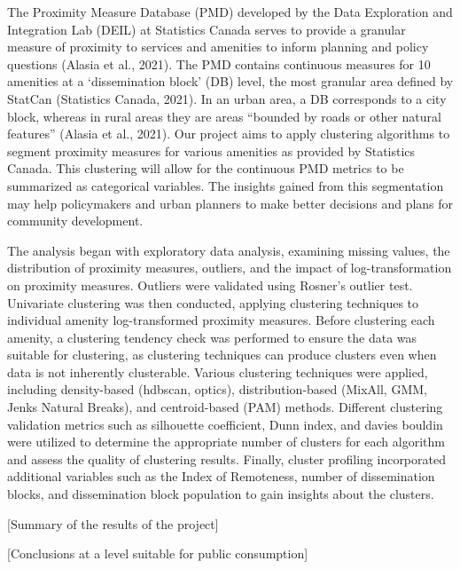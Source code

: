 \documentclass[11pt, a4paper]{article}
\begin{document}
\normalsize
The Proximity Measure Database (PMD) developed by the Data Exploration and Integration Lab (DEIL) at Statistics Canada serves to provide a granular measure of proximity to services and amenities to inform planning and policy questions (Alasia et al., 2021). The PMD contains continuous measures for 10 amenities at a `dissemination block' (DB) level, the most granular area defined by StatCan (Statistics Canada, 2021). In an urban area, a DB corresponds to a city block, whereas in rural areas they are areas ``bounded by roads or other natural features'' (Alasia et al., 2021). Our project aims to apply clustering algorithms to segment proximity measures for various amenities as provided by Statistics Canada. This clustering will allow for the continuous PMD metrics to be summarized as categorical variables. The insights gained from this segmentation may help policymakers and urban planners to make better decisions and plans for community development.
\par
The analysis began with exploratory data analysis, examining missing values, the distribution of proximity measures, outliers, and the impact of log-transformation on proximity measures. Outliers were validated using Rosner's outlier test. Univariate clustering was then conducted, applying clustering techniques to individual amenity log-transformed proximity measures. Before clustering each amenity, a clustering tendency check was performed to ensure the data was suitable for clustering, as clustering techniques can produce clusters even when data is not inherently clusterable. Various clustering techniques were applied, including density-based (hdbscan, optics), distribution-based (MixAll, GMM, Jenks Natural Breaks), and centroid-based (PAM) methods. Different clustering validation metrics such as silhouette coefficient, Dunn index, and davies bouldin were utilized to determine the appropriate number of clusters for each algorithm and assess the quality of clustering results. Finally, cluster profiling incorporated additional variables such as the Index of Remoteness, number of dissemination blocks, and dissemination block population to gain insights about the clusters.




[Summary of the results of the project]

[Conclusions at a level suitable for public consumption]








\pagebreak
\end{document}
